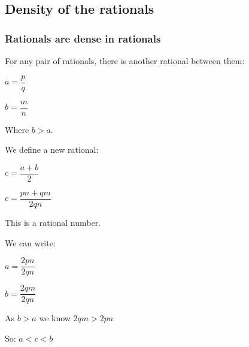 \subsection{Density of the rationals}

\subsubsection{Rationals are dense in rationals}

For any pair of rationals, there is another rational between them:

\(a=\dfrac{p}{q}\)

\(b=\dfrac{m}{n}\)

Where \(b>a\).

We define a new rational:

\(c=\dfrac{a+b}{2}\)

\(c=\dfrac{pn+qm}{2qn}\)

This is a rational number.

We can write:

\(a=\dfrac{2pn}{2qn}\)

\(b=\dfrac{2qm}{2qn}\)

As \(b>a\) we know \(2qm>2pn\)

So: \(a < c < b\)

